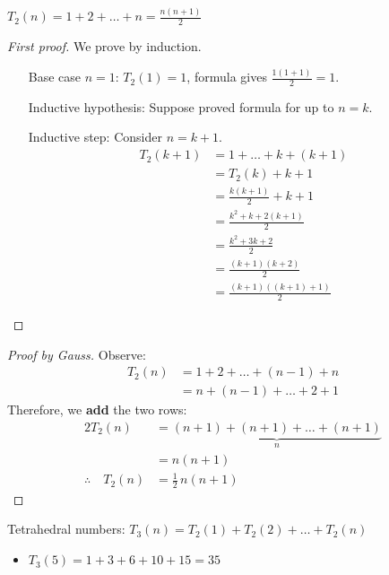 \documentclass[12pt]{article}
\begin{document}
\begin{theorem}
    $T_2(n)=1+2+\dots+n=\frac{n(n+1)}{2}$
\end{theorem}
\begin{proof}[First proof]We prove by induction.
    \begin{itemize}[align=left]
        \item[Base case $n=1$:] $T_2(1)=1$, formula gives $\frac{1(1+1)}{2}=1$.
        \item[Inductive hypothesis:] Suppose proved formula for up to $n=k$.
        \item[Inductive step:] Consider $n=k+1$. \begin{align*}
            T_2(k+1)&=1+\dots+k+(k+1)\\
            &= T_2(k)+k+1\\
            &= \frac{k(k+1)}{2}+k+1\\
            &= \frac{k^2+k+2(k+1)}{2}\\
            &= \frac{k^2+3k+2}{2}\\
            &= \frac{(k+1)(k+2)}{2}\\
            &= \frac{(k+1)\left((k+1)+1\right)}{2}
        \end{align*}  
    \end{itemize}
\end{proof}

\begin{proof}[Proof by Gauss]
    Observe:
    \begin{align*}
        T_2(n) & = 1+2 +\dots + (n-1) + n\\
        &= n+(n-1) + \dots + 2 + 1
    \end{align*}
    Therefore, we \textbf{add} the two rows:
    \begin{align*}
        2T_2(n)&= \underset{n}{\underbrace{(n+1)+(n+1)+\dots+(n+1)}}\\
        &= n(n+1)\\
        \therefore \quad T_2(n) &= \frac{1}{2}\,n(n+1)
    \end{align*}
\end{proof}

 Tetrahedral numbers: $T_3(n) = T_2(1) + T_2(2)+\dots + T_2(n)$
\begin{itemize}
    \item $T_3(5) = 1+3+6+10+15=35$
\end{itemize}
\end{document}
